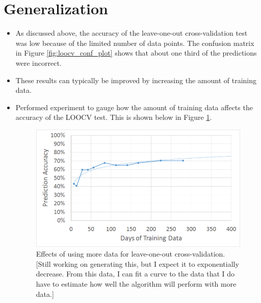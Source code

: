 \documentclass[12pt]{report}
\begin{document}
\section{Generalization}
\begin{itemize}
\item As discussed above, the accuracy of the leave-one-out cross-validation test was low because of the limited number of data points.  The confusion matrix in Figure \ref{fig:loocv_conf_plot} shows that about one third of the predictions were incorrect.  
\item These results can typically be improved by increasing the amount of training data. 
\item Performed experiment to gauge how the amount of training data affects the accuracy of the LOOCV test.  This is shown below in Figure  \ref{fig:loocv_generalization}.
\begin{figure}[t]
    \centering
        \includegraphics[width=.7\columnwidth,trim={1mm 2mm 1mm 3.5mm},clip]{generalization}
        \vspace{-7pt}
        \caption[Effects of more data on accuracy]{Effects of using more data for leave-one-out cross-validation.  [Still working on generating this, but I expect it to exponentially decrease.  From this data, I can fit a curve to the data that I do have to estimate how well the algorithm will perform with more data.]}
        \label{fig:loocv_generalization}
\end{figure}
\end{itemize}
\end{document}

